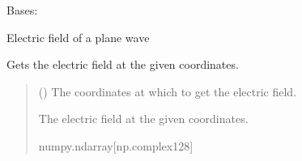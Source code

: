 \documentclass[letterpaper,10pt,english]{sphinxmanual}
\begin{document}
\begin{fulllineitems}
\label{\detokenize{source/Sources:Sources.PlaneWave}}
\pysigstartsignatures
\pysiglinewithargsret
{}
{\sphinxparamcomma {}\sphinxparamcomma {}\sphinxparamcomma {}\sphinxparamcomma {}}
{}
\pysigstopsignatures
\sphinxAtStartPar
Bases: {\hyperref[\detokenize{source/Sources:Sources.ElectricFieldSource}]{}}

\sphinxAtStartPar
Electric field of a plane wave


\begin{fulllineitems}
\label{\detokenize{source/Sources:Sources.PlaneWave.get_electric_field}}
\pysigstartsignatures
\pysiglinewithargsret
{}
{}
{}
\pysigstopsignatures
\sphinxAtStartPar
Gets the electric field at the given coordinates.
\begin{quote}\begin{description}
\sphinxAtStartPar
{} (\sphinxstyleliteralemphasis{\sphinxupquote{{[}}}\sphinxstyleliteralemphasis{\sphinxupquote{{]}}}) \textendash{} The coordinates at which to get the electric field.

\sphinxAtStartPar
The electric field at the given coordinates.

\sphinxAtStartPar
numpy.ndarray{[}np.complex128{]}

\end{description}\end{quote}

\end{fulllineitems}


\end{fulllineitems}
\end{document}
